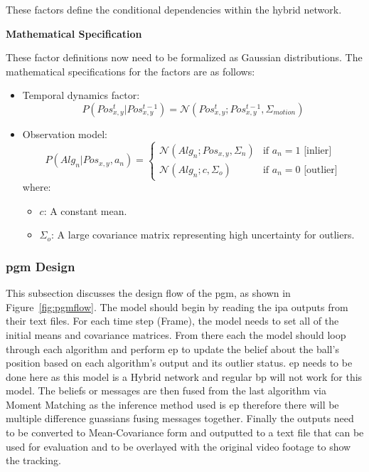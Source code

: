 \documentclass[12pt,a4paper]{article}
\begin{document}
These factors define the conditional dependencies within the hybrid network.

\textbf{Mathematical Specification}

These factor definitions now need to be formalized as Gaussian distributions. The mathematical specifications for the factors are as follows:

\begin{itemize}
	\item Temporal dynamics factor:
	\begin{equation} P(Pos_{x,y}^t | Pos_{x,y}^{t-1}) = \mathcal{N}(Pos_{x,y}^t; Pos_{x,y}^{t-1}, \Sigma_{motion}) \end{equation}
	\item Observation model:
	\begin{equation}
	P(Alg_n | Pos_{x,y}, a_n) = \begin{cases}
	\mathcal{N}(Alg_n; Pos_{x,y}, \Sigma_n) & \text{if } a_n = 1 \text{ [inlier]} \\
	\mathcal{N}(Alg_n; c, \Sigma_o) & \text{if } a_n = 0 \text{ [outlier]}
	\end{cases}
	\end{equation}
	where:
	\begin{itemize}
		\item $c$: A constant mean.
		\item $\Sigma_o$: A large covariance matrix representing high uncertainty for outliers.
	\end{itemize}
\end{itemize}

 \subsubsection{\acs{pgm} Design}
This subsection discusses the design flow of the \acs{pgm}, as shown in Figure~\ref{fig:pgmflow}. The model should begin by reading the \acs{ipa} outputs from their text files. For each time step (Frame), the model needs to set all of the initial means and covariance matrices. From there each the model should loop through each algorithm and perform \acs{ep} to update the belief about the ball's position based on each algorithm's output and its outlier status. \acs{ep} needs to be done here as this model is a Hybrid network and regular \acs{bp} will not work for this model. The beliefs or messages are then fused from the last algorithm via Moment Matching as the inference method used is \acs{ep} therefore there will be multiple difference guassians fusing messages together. Finally the outputs need to be converted to Mean-Covariance form and outputted to a text file that can be used for evaluation and to be overlayed with the original video footage to show the tracking.
 
\end{document}
